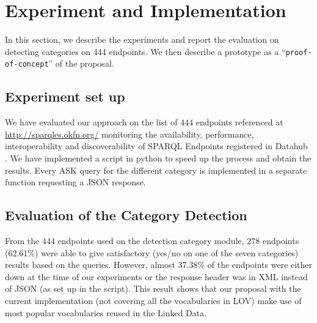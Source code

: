 \section{Experiment and Implementation}
\label{sec:evaluation}
In this section, we describe the experiments and report the evaluation on detecting categories on 444 endpoints. We then describe a prototype as a ``\texttt{proof-of-concept}'' of the proposal. 

\subsection{Experiment set up}
We have evaluated our approach on the list of $444$ endpoints referenced at \url{http://sparqles.okfn.org/} monitoring the availability, performance, interoperability and discoverability of SPARQL Endpoints registered in Datahub \cite{buil2013} . We have implemented a script in python to speed up the process and obtain the results. Every ASK query for the different category is implemented in a separate function requesting a JSON response.
 

\subsection{Evaluation of the Category Detection}
From the $444$ endpoints used on the detection category module, $278$ endpoints (62.61\%) were able to give satisfactory (yes/no on one of the seven categories) results based on the queries. However, almost 37.38\% of the endpoints were either down at the time of our experiments or the response header was in XML instead of JSON (as set up in the script). This result shows that our proposal with the current implementation (not covering all the vocabularies in LOV) make use of most popular vocabularies reused in the Linked Data. 
\begin{table}[!htbp]
\end{table}

